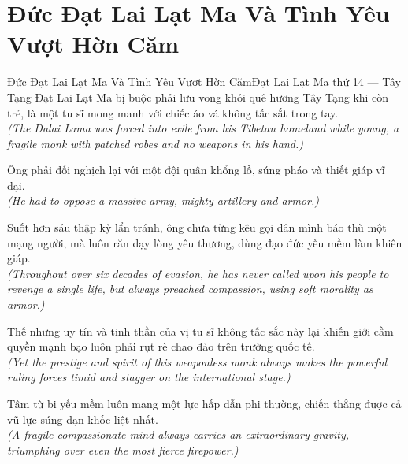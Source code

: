 \section{Đức Đạt Lai Lạt Ma Và Tình Yêu Vượt Hờn Căm}
\begin{truyen}{Đức Đạt Lai Lạt Ma Và Tình Yêu Vượt Hờn Căm}{Đạt Lai Lạt Ma thứ 14 --- Tây Tạng}
 Đạt Lai Lạt Ma bị buộc phải lưu vong khỏi quê hương Tây Tạng khi còn trẻ, là một tu sĩ mong manh với chiếc áo vá không tấc sắt trong tay.\\[4pt]
\textit{(The Dalai Lama was forced into exile from his Tibetan homeland while young, a fragile monk with patched robes and no weapons in his hand.)}

Ông phải đối nghịch lại với một đội quân khổng lồ, súng pháo và thiết giáp vĩ đại.\\[4pt]
\textit{(He had to oppose a massive army, mighty artillery and armor.)}

Suốt hơn sáu thập kỷ lẩn tránh, ông chưa từng kêu gọi dân mình báo thù một mạng người, mà luôn răn dạy lòng yêu thương, dùng đạo đức yếu mềm làm khiên giáp.\\[4pt]
\textit{(Throughout over six decades of evasion, he has never called upon his people to revenge a single life, but always preached compassion, using soft morality as armor.)}

Thế nhưng uy tín và tinh thần của vị tu sĩ không tấc sắc này lại khiến giới cầm quyền mạnh bạo luôn phải rụt rè chao đảo trên trường quốc tế.\\[4pt]
\textit{(Yet the prestige and spirit of this weaponless monk always makes the powerful ruling forces timid and stagger on the international stage.)}

\end{truyen}
\begin{baihoc}
  Tâm từ bi yếu mềm luôn mang một lực hấp dẫn phi thường, chiến thắng được cả vũ lực súng đạn khốc liệt nhất.\\[4pt]
  \textit{(A fragile compassionate mind always carries an extraordinary gravity, triumphing over even the most fierce firepower.)}
\end{baihoc}

